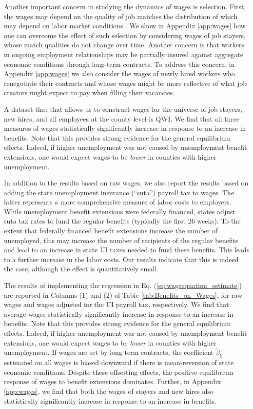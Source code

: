 \documentclass[12pt]{article}
\newcommand{\1}{\mathbf{1}}
\begin{document}
Another important concern in studying the dynamics of wages is selection. First, the wages may depend on the quality of job matches the distribution of which may depend on labor market conditions \citep{gertler+trigari:09, hagedorn+manovskii:13}. We show in Appendix \ref{app:wages} how one can overcome the effect of such selection by considering wages of job stayers, whose match qualities do not change over time. Another concern is that workers in ongoing employment relationships may be partially insured against aggregate economic conditions through long-term contracts. To address this concern, in Appendix \ref{app:wages} we also consider the wages of newly hired workers who renegotiate their contracts and whose wages might be more reflective of what job creators might expect to pay when filling their vacancies. 

A dataset that that allows us to construct wages for the universe of job stayers, new hires, and all employees at the county level is QWI. We find that all three measures of wages statistically significantly increase in response to an increase in benefits. Note that this provides strong evidence for the general equilibrium effects. Indeed, if higher unemployment was not caused by unemployment benefit extensions, one would expect wages to be \emph{lower} in counties with higher unemployment.

In addition to the results based on raw wages, we also report the results based on adding the state unemployment insurance (``suta'') payroll tax to wages. The latter represents a more comprehensive measure of labor costs to employers. While unemployment benefit extensions were federally financed, states adjust suta tax rates to fund the regular benefits (typically the first 26 weeks). To the extent that federally financed benefit extensions increase the number of unemployed, this may increase the number of recipients of the regular benefits and lead to an increase in state UI taxes needed to fund these benefits. This leads to a further increase in the labor costs. Our results indicate that this is indeed the case, although the effect is quantitatively small.


The results of implementing the regression in Eq. (\ref{eq:wageequation_estimate}) are reported in Columns (1) and (2) of Table \ref{tab:Benefits_on_Wages}, for raw wages and wages adjusted for the UI payroll tax, respectively. We find that average wages statistically significantly increase in response to an increase in benefits. Note that this provides strong evidence for the general equilibrium effects. Indeed, if higher unemployment was not caused by unemployment benefit extensions, one would expect wages to be \emph{lower} in counties with higher unemployment. If wages are set by long term contracts, the coefficient $\tilde{\beta}_b$ estimated on all wages is biased downward if there is mean-reversion of state economic conditions. Despite these offsetting effects, the positive equilibrium response of wages to benefit extensions dominates. Further, in Appendix \ref{app:wages}, we find that both the wages of stayers and new hires also statistically significantly increase in response to an increase in benefits.
\end{document}
